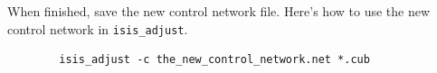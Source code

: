 When finished, save the new control network file. Here's how to use
the new control network in \texttt{isis\_adjust}.

\begin{verbatim}
        isis_adjust -c the_new_control_network.net *.cub
\end{verbatim}

% 
% 
